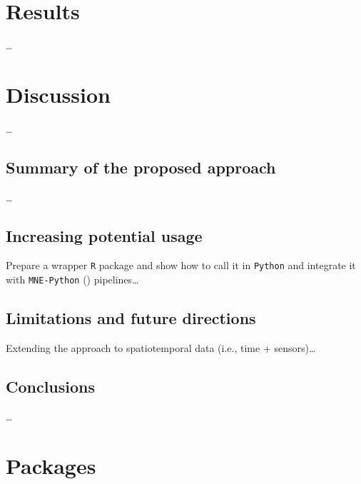 \documentclass[
  doc,
  floatsintext,
  longtable,
  a4paper,
  nolmodern,
  notxfonts,
  notimes,
  colorlinks=true,linkcolor=blue,citecolor=blue,urlcolor=blue]{apa7}
\begin{document}
\newpage

\section{Results}\label{results}

\ldots{}

\newpage

\section{Discussion}\label{discussion}

\ldots{}

\subsection{Summary of the proposed
approach}\label{summary-of-the-proposed-approach}

\ldots{}

\subsection{Increasing potential
usage}\label{increasing-potential-usage}

Prepare a wrapper \texttt{R} package and show how to call it in
\texttt{Python} and integrate it with \texttt{MNE-Python}
() pipelines\ldots{}

\subsection{Limitations and future
directions}\label{limitations-and-future-directions}

Extending the approach to spatiotemporal data (i.e., time +
sensors)\ldots{}

\subsection{Conclusions}\label{conclusions}

\ldots{}

\newpage

\section{Packages}\label{packages}
\end{document}
